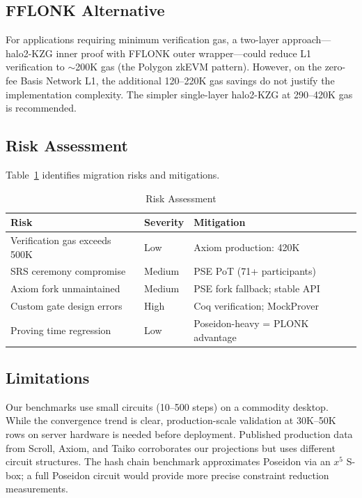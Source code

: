 \subsection{FFLONK Alternative}

For applications requiring minimum verification gas, a two-layer
approach---halo2-KZG inner proof with FFLONK outer wrapper---could
reduce L1 verification to $\sim$200K gas (the Polygon zkEVM
pattern). However, on the zero-fee Basis Network L1, the
additional 120--220K gas savings do not justify the implementation
complexity. The simpler single-layer halo2-KZG at 290--420K gas
is recommended.

\subsection{Risk Assessment}

Table~\ref{tab:risks} identifies migration risks and mitigations.

\begin{table}[htbp]
\caption{Risk Assessment}
\label{tab:risks}
\centering
\begin{tabular}{@{}p{2.5cm}lp{3cm}@{}}
\toprule
\textbf{Risk} & \textbf{Severity} & \textbf{Mitigation} \\
\midrule
Verification gas exceeds 500K & Low & Axiom production: 420K \\
SRS ceremony compromise & Medium & PSE PoT (71+ participants) \\
Axiom fork unmaintained & Medium & PSE fork fallback; stable API \\
Custom gate design errors & High & Coq verification; MockProver \\
Proving time regression & Low & Poseidon-heavy = PLONK advantage \\
\bottomrule
\end{tabular}
\end{table}

\subsection{Limitations}

Our benchmarks use small circuits (10--500 steps) on a commodity
desktop. While the convergence trend is clear, production-scale
validation at 30K--50K rows on server hardware is needed before
deployment. Published production data from Scroll, Axiom, and
Taiko corroborates our projections but uses different circuit
structures. The hash chain benchmark approximates Poseidon via
an $x^5$ S-box; a full Poseidon circuit would provide more
precise constraint reduction measurements.
